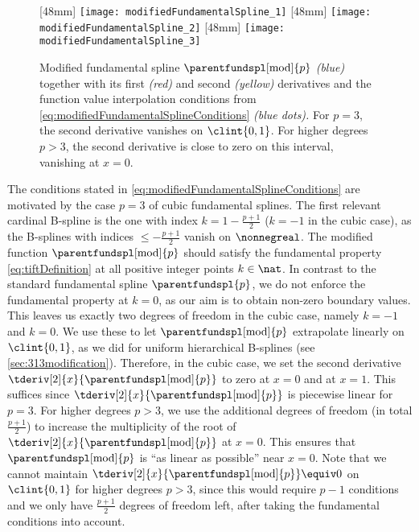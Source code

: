 \begin{figure}
  [48mm]{%
    \texttt{[image: modifiedFundamentalSpline\_1]}%
  }%
  \hfill%
  [48mm]{%
    \texttt{[image: modifiedFundamentalSpline\_2]}%
  }%
  \hfill%
  [48mm]{%
    \texttt{[image: modifiedFundamentalSpline\_3]}%
  }%
  \caption[%
    Modified fundamental spline and its derivatives%
  ]{%
    Modified fundamental spline $\parentfundspl[\modified]{p}$
    \emph{\textcolor{C0}{(blue)}} together with its
    first \emph{\textcolor{C1}{(red)}} and
    second \emph{\textcolor{C2!90!black}{(yellow)}} derivatives
    and the function value interpolation conditions from
    \cref{eq:modifiedFundamentalSplineConditions}
    \emph{\textcolor{C0}{(blue dots)}.}
    For $p = 3$, the second derivative vanishes on
    $\clint{0, 1}$.
    For higher degrees $p > 3$, the second derivative is close to zero
    on this interval, vanishing at $x = 0$.%
  }%
  \label{fig:modifiedFundamentalSpline}%
\end{figure}

The conditions stated in \eqref{eq:modifiedFundamentalSplineConditions}
are motivated by the case $p = 3$ of cubic fundamental splines.
The first relevant cardinal B-spline is the one with
index $k = 1 - \tfrac{p+1}{2}$ ($k = -1$ in the cubic case),
as the B-splines with indices $\le -\tfrac{p+1}{2}$ vanish on $\nonnegreal$.
The modified function $\parentfundspl[\modified]{p}$
should satisfy the fundamental property \eqref{eq:tiftDefinition}
at all positive integer points $k \in \nat$.
In contrast to the standard fundamental spline $\parentfundspl{p}$,
we do not enforce the fundamental property at $k = 0$,
as our aim is to obtain non-zero boundary values.
This leaves us exactly two degrees of freedom in the cubic case,
namely $k = -1$ and $k = 0$.
We use these to let $\parentfundspl[\modified]{p}$ extrapolate
linearly on $\clint{0, 1}$, as we did for uniform hierarchical
B-splines (see \cref{sec:313modification}).
Therefore, in the cubic case, we set the second derivative
$\tderiv[2]{x}{\parentfundspl[\modified]{p}}$ to zero
at $x = 0$ and at $x = 1$.
This suffices since
$\tderiv[2]{x}{\parentfundspl[\modified]{p}}$ is piecewise
linear for $p = 3$.
For higher degrees $p > 3$,
we use the additional degrees of freedom (in total $\tfrac{p+1}{2}$)
to increase the multiplicity of the root of
$\tderiv[2]{x}{\parentfundspl[\modified]{p}}$ at $x = 0$.
This ensures that $\parentfundspl[\modified]{p}$ is
``as linear as possible'' near $x = 0$.
Note that we cannot maintain
$\tderiv[2]{x}{\parentfundspl[\modified]{p}} \equiv 0$
on $\clint{0, 1}$ for higher degrees $p > 3$,
since this would require $p - 1$ conditions
and we only have $\tfrac{p+1}{2}$ degrees of freedom left,
after taking the fundamental conditions into account.



